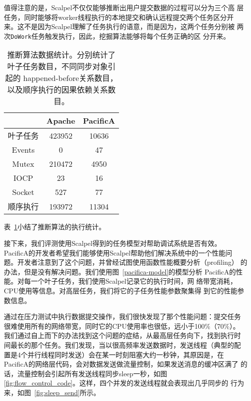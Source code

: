 值得注意的是，Scalpel不仅仅能够推断出用户提交数据的过程可以分为三个高
层任务，同时能够将worker线程执行的本地提交和确认远程提交两个任务区分开
来。这不是因为Scalpel理解了任务执行的语意，而是因为，这两个任务分别被
两次\texttt{DoWork}任务触发执行，因此，挖掘算法能够将每个任务正确的区
分开来。

\begin{table}[t!]
\small
\centering
\begin{minipage}{0.8\linewidth}
\centering
\caption{推断算法数据统计。分别统计了叶子任务数目，不同同步对象引起的
happened-before关系数目，以及顺序执行的因果依赖关系数目。}
\label{scp:statistics}
\begin{tabular}{ccc}

\toprule[1.5pt]
  		& Apache	& PacificA \\
\midrule[1pt]
叶子任务	& 423952	& 10636 \\
Events		& 0			& 47 \\
Mutex 		& 210472	& 4950 \\
IOCP		& 23		& 16 \\
Socket		& 527		& 77 \\
顺序执行	& 193972	& 11304 \\
\bottomrule[1.5pt]
\end{tabular}
\end{minipage}
\end{table}

表~\ref{scp:statistics}小结了推断算法的执行统计。

接下来，我们评测使用Scalpel得到的任务模型对帮助调试系统是否有效。
PacificA的开发者希望我们能够使用Scalpel帮助他们解决系统中的一个性能问
题。开发者注意到了这个问题，并曾经试图使用函数性能概要分析（profiling）
的办法，但是没有解决问题。我们使用图~\ref{pacifica-model}的模型分析
PacificA的性能。对每一个叶子任务，我们使用Scalpel记录它的执行时间，网
络带宽消耗，CPU使用等信息。对高层任务，我们将它的子任务性能参数聚集得
到它的性能参数信息。

通过在压力测试中执行数据提交操作，我们很快发现了那个性能问题：提交任务
很难使用所有的网络带宽，同时它的CPU使用率也很低，远小于100\%（70\%）。
我们通过自上而下的办法找到这个问题的症结，从最高层任务向下，找到执行时
间最长的那个任务。我们发现，当以很高频率发送数据时，发送线程（典型的配
置是4个并行线程同时发送）会在某一时刻阻塞大约一秒钟，其原因是，在
PacificA的网络层代码，会对数据发送做流量控制，如果发送消息的缓冲区满了
的话，流量控制会引起所有发送线程同步sleep一秒，如图~
\ref{fig:flow_control_code}。这样，四个并发的发送线程就会表现出几乎同步的
行为来，如图~\ref{fig:sleep_send}所示。

